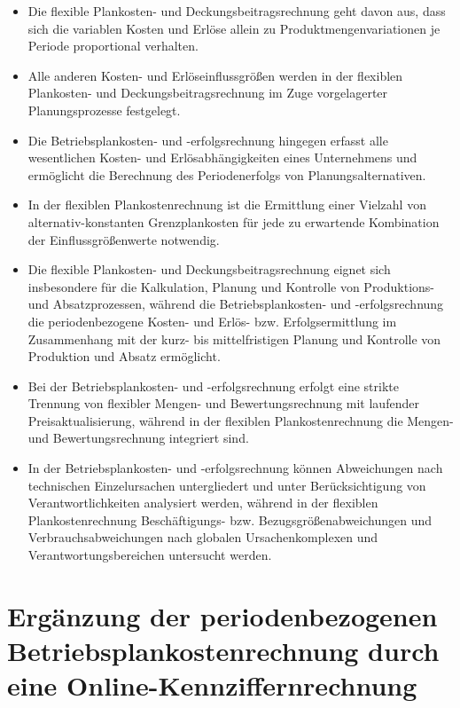 \begin{itemize}
    \item Die flexible Plankosten- und Deckungsbeitragsrechnung geht davon aus, dass sich die variablen Kosten und Erlöse allein zu Produktmengenvariationen je Periode proportional verhalten.
    \item Alle anderen Kosten- und Erlöseinflussgrö{\ss}en werden in der flexiblen Plankosten- und Deckungsbeitragsrechnung im Zuge vorgelagerter Planungsprozesse festgelegt.
    \item Die Betriebsplankosten- und -erfolgsrechnung hingegen erfasst alle wesentlichen Kosten- und Erlösabhängigkeiten eines Unternehmens und ermöglicht die Berechnung des Periodenerfolgs von Planungsalternativen.
    \item In der flexiblen Plankostenrechnung ist die Ermittlung einer Vielzahl von alternativ-konstanten Grenzplankosten für jede zu erwartende Kombination der Einflussgrö{\ss}enwerte notwendig.
    \item  Die flexible Plankosten- und Deckungsbeitragsrechnung eignet sich insbesondere für die Kalkulation, Planung und Kontrolle von Produktions- und Absatzprozessen, während die Betriebsplankosten- und -erfolgsrechnung die periodenbezogene Kosten- und Erlös- bzw. Erfolgsermittlung im Zusammenhang mit der kurz- bis mittelfristigen Planung und Kontrolle von Produktion und Absatz ermöglicht.
    \item Bei der Betriebsplankosten- und -erfolgsrechnung erfolgt eine strikte Trennung von flexibler Mengen- und Bewertungsrechnung mit laufender Preisaktualisierung, während in der flexiblen Plankostenrechnung die Mengen- und Bewertungsrechnung integriert sind.
    \item In der Betriebsplankosten- und -erfolgsrechnung können Abweichungen nach technischen Einzelursachen untergliedert und unter Berücksichtigung von Verantwortlichkeiten analysiert werden, während in der flexiblen Plankostenrechnung Beschäftigungs- bzw. Bezugsgrö{\ss}enabweichungen und Verbrauchsabweichungen nach globalen Ursachenkomplexen und Verantwortungsbereichen untersucht werden.
\end{itemize}

\section{Ergänzung der periodenbezogenen Betriebsplankostenrechnung durch eine Online-Kennziffernrechnung}

